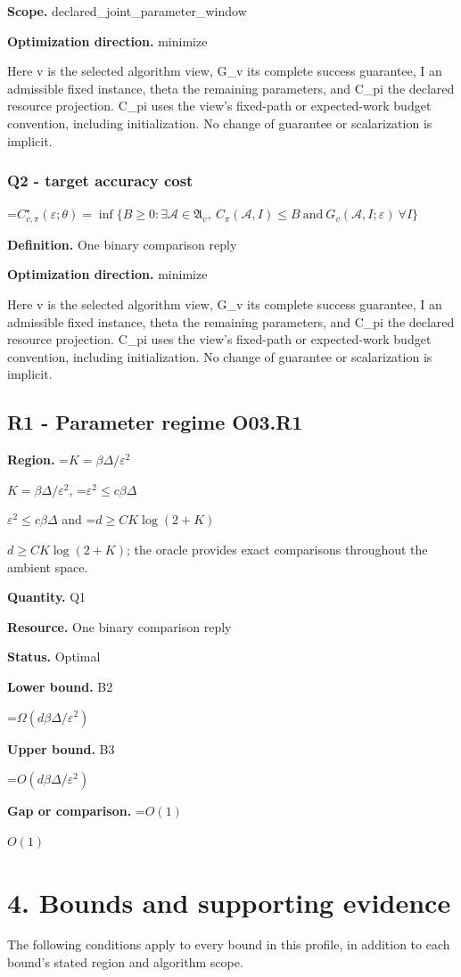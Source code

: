 \documentclass[10pt,a4paper]{article}
\newcommand{\AtlasMath}[1]{\par\begingroup\centering\setbox0=\hbox{$\displaystyle #1$}\ifdim\wd0>1.4\linewidth\typeout{ATLAS WIDE FORMULA: \the\wd0}\fi\ifdim\wd0>\linewidth\resizebox{\linewidth}{!}{\box0}\else\box0\fi\par\endgroup}
\newcommand{\AtlasInlineMath}[1]{\begingroup\setbox0=\hbox{$#1$}\ifdim\wd0>.4\linewidth\endgroup\AtlasMath{#1}\else\endgroup$#1$\fi}
\begin{document}
\textbf{Scope.} declared\_joint\_parameter\_window

\textbf{Optimization direction.} minimize

Here v is the selected algorithm view, G\_v its complete success guarantee, I an admissible fixed instance, theta the remaining parameters, and C\_pi the declared resource projection. C\_pi uses the view's fixed-path or expected-work budget convention, including initialization. No change of guarantee or scalarization is implicit.

\subsubsection{Q2 - target accuracy cost}
\AtlasMath{C^\star_{v,\pi}(\varepsilon;\theta)=\inf\{B\ge0:\exists\mathcal A\in\mathfrak A_v,\ C_\pi(\mathcal A,I)\le B\ \text{and}\ G_v(\mathcal A,I;\varepsilon)\ \forall I\}}
\textbf{Definition.} One binary comparison reply

\textbf{Optimization direction.} minimize

Here v is the selected algorithm view, G\_v its complete success guarantee, I an admissible fixed instance, theta the remaining parameters, and C\_pi the declared resource projection. C\_pi uses the view's fixed-path or expected-work budget convention, including initialization. No change of guarantee or scalarization is implicit.

\subsection{R1 - Parameter regime O03.R1}
\textbf{Region.} \AtlasInlineMath{K=\beta\Delta/\varepsilon^2}, \AtlasInlineMath{\varepsilon^2\le c\beta\Delta} and \AtlasInlineMath{d\ge CK\log(2+K)}; the oracle provides exact comparisons throughout the ambient space.

\textbf{Quantity.} Q1

\textbf{Resource.} One binary comparison reply

\textbf{Status.} Optimal

\textbf{Lower bound.} B2

\AtlasMath{\Omega(d\beta\Delta/\varepsilon^2)}
\textbf{Upper bound.} B3

\AtlasMath{O(d\beta\Delta/\varepsilon^2)}
\textbf{Gap or comparison.} \AtlasInlineMath{O(1)}

\section{4. Bounds and supporting evidence}
The following conditions apply to every bound in this profile, in addition to each bound's stated region and algorithm scope.
\end{document}
